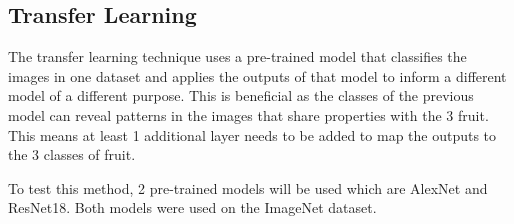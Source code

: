 \documentclass[../main.tex]{subfiles}
\begin{document}
\subsection{Transfer Learning}

The transfer learning technique uses a pre-trained model that classifies the images in one dataset and applies the outputs of that model to inform a different model of a different purpose. This is beneficial as the classes of the previous model can reveal patterns in the images that share properties with the 3 fruit. This means at least 1 additional layer needs to be added to map the outputs to the 3 classes of fruit.

To test this method, 2 pre-trained models will be used which are AlexNet and ResNet18. Both models were used on the ImageNet dataset. 
\end{document}
